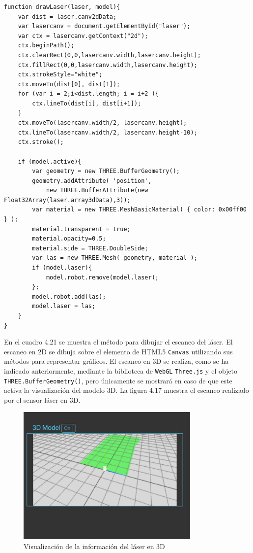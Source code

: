 \begin{lstlisting}[caption= Método para bibujar el escaneo del sensor láser, label=cod.dibujarlaser]
function drawLaser(laser, model){
	var dist = laser.canv2dData;
	var lasercanv = document.getElementById("laser");
	var ctx = lasercanv.getContext("2d");
	ctx.beginPath();
	ctx.clearRect(0,0,lasercanv.width,lasercanv.height);
	ctx.fillRect(0,0,lasercanv.width,lasercanv.height);
	ctx.strokeStyle="white";
	ctx.moveTo(dist[0], dist[1]);
	for (var i = 2;i<dist.length; i = i+2 ){
		ctx.lineTo(dist[i], dist[i+1]);
	}
	ctx.moveTo(lasercanv.width/2, lasercanv.height);
	ctx.lineTo(lasercanv.width/2, lasercanv.height-10);
	ctx.stroke();
	
	if (model.active){
		var geometry = new THREE.BufferGeometry();
		geometry.addAttribute( 'position', 
			new THREE.BufferAttribute(new Float32Array(laser.array3dData),3));
		var material = new THREE.MeshBasicMaterial( { color: 0x00ff00 } );
		material.transparent = true;
		material.opacity=0.5;
		material.side = THREE.DoubleSide;
		var las = new THREE.Mesh( geometry, material );
		if (model.laser){
			model.robot.remove(model.laser);
		};
		model.robot.add(las);
		model.laser = las;
	}
}
\end{lstlisting}

En el cuadro 4.21 se muestra el método para dibujar el escaneo del láser. El escaneo en 2D se dibuja sobre el elemento de HTML5 \texttt{Canvas} utilizando sus métodos para representar gráficos. El escaneo en 3D se realiza, como se ha indicado anteriormente, mediante la biblioteca de \texttt{WebGL} \texttt{Three.js} y el objeto \texttt{THREE.BufferGeometry()}, pero únicamente se mostrará en caso de que este activa la visualización del modelo 3D. La figura 4.17 muestra el escaneo realizado por el sensor láser en 3D.

\begin{figure}[H]
  \begin{center}
    \includegraphics[width=0.8\textwidth]{figures/laser3dturtle.png}
		\caption{Visualización de la información del láser en 3D}
		\label{fig.laser3dturtle}
		\end{center}
\end{figure}

